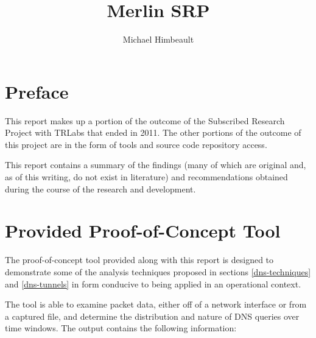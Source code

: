 \documentclass{article}
\theoremstyle{remark}
\theoremstyle{definition}
\theoremstyle{definition}
\theoremstyle{definition}
\begin{document}

\title{Merlin SRP}
\author{Michael Himbeault}

\maketitle

\tableofcontents

\newpage

\section{Preface}
This report makes up a portion of the outcome of the Subscribed Research Project with TRLabs that ended in 2011. The other portions of the outcome of this project are in the form of tools and source code repository access.

This report contains a summary of the findings (many of which are original and, as of this writing, do not exist in literature) and recommendations obtained during the course of the research and development.

\section{Provided Proof-of-Concept Tool}
The proof-of-concept tool provided along with this report is designed to demonstrate some of the analysis techniques proposed in sections \ref{dns-techniques} and \ref{dns-tunnels} in form conducive to being applied in an operational context.

The tool is able to examine packet data, either off of a network interface or from a captured file, and determine the distribution and nature of DNS queries over time windows. The output contains the following information:
\end{document}
